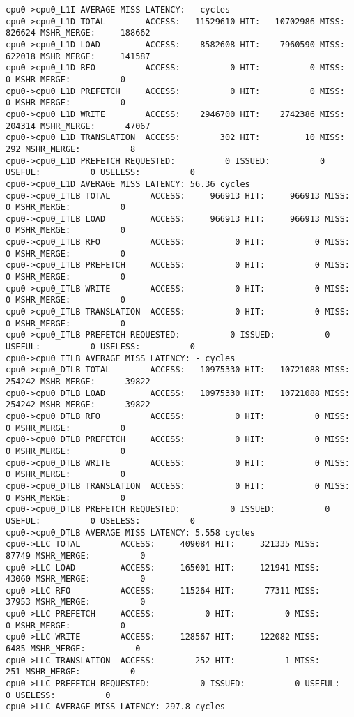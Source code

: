 \documentclass[17pt]{article}
\begin{document}
\begin{LTR}
\begin{lstlisting}[basicstyle=\tiny\ttfamily]
cpu0->cpu0_L1I AVERAGE MISS LATENCY: - cycles
cpu0->cpu0_L1D TOTAL        ACCESS:   11529610 HIT:   10702986 MISS:     826624 MSHR_MERGE:     188662
cpu0->cpu0_L1D LOAD         ACCESS:    8582608 HIT:    7960590 MISS:     622018 MSHR_MERGE:     141587
cpu0->cpu0_L1D RFO          ACCESS:          0 HIT:          0 MISS:          0 MSHR_MERGE:          0
cpu0->cpu0_L1D PREFETCH     ACCESS:          0 HIT:          0 MISS:          0 MSHR_MERGE:          0
cpu0->cpu0_L1D WRITE        ACCESS:    2946700 HIT:    2742386 MISS:     204314 MSHR_MERGE:      47067
cpu0->cpu0_L1D TRANSLATION  ACCESS:        302 HIT:         10 MISS:        292 MSHR_MERGE:          8
cpu0->cpu0_L1D PREFETCH REQUESTED:          0 ISSUED:          0 USEFUL:          0 USELESS:          0
cpu0->cpu0_L1D AVERAGE MISS LATENCY: 56.36 cycles
cpu0->cpu0_ITLB TOTAL        ACCESS:     966913 HIT:     966913 MISS:          0 MSHR_MERGE:          0
cpu0->cpu0_ITLB LOAD         ACCESS:     966913 HIT:     966913 MISS:          0 MSHR_MERGE:          0
cpu0->cpu0_ITLB RFO          ACCESS:          0 HIT:          0 MISS:          0 MSHR_MERGE:          0
cpu0->cpu0_ITLB PREFETCH     ACCESS:          0 HIT:          0 MISS:          0 MSHR_MERGE:          0
cpu0->cpu0_ITLB WRITE        ACCESS:          0 HIT:          0 MISS:          0 MSHR_MERGE:          0
cpu0->cpu0_ITLB TRANSLATION  ACCESS:          0 HIT:          0 MISS:          0 MSHR_MERGE:          0
cpu0->cpu0_ITLB PREFETCH REQUESTED:          0 ISSUED:          0 USEFUL:          0 USELESS:          0
cpu0->cpu0_ITLB AVERAGE MISS LATENCY: - cycles
cpu0->cpu0_DTLB TOTAL        ACCESS:   10975330 HIT:   10721088 MISS:     254242 MSHR_MERGE:      39822
cpu0->cpu0_DTLB LOAD         ACCESS:   10975330 HIT:   10721088 MISS:     254242 MSHR_MERGE:      39822
cpu0->cpu0_DTLB RFO          ACCESS:          0 HIT:          0 MISS:          0 MSHR_MERGE:          0
cpu0->cpu0_DTLB PREFETCH     ACCESS:          0 HIT:          0 MISS:          0 MSHR_MERGE:          0
cpu0->cpu0_DTLB WRITE        ACCESS:          0 HIT:          0 MISS:          0 MSHR_MERGE:          0
cpu0->cpu0_DTLB TRANSLATION  ACCESS:          0 HIT:          0 MISS:          0 MSHR_MERGE:          0
cpu0->cpu0_DTLB PREFETCH REQUESTED:          0 ISSUED:          0 USEFUL:          0 USELESS:          0
cpu0->cpu0_DTLB AVERAGE MISS LATENCY: 5.558 cycles
cpu0->LLC TOTAL        ACCESS:     409084 HIT:     321335 MISS:      87749 MSHR_MERGE:          0
cpu0->LLC LOAD         ACCESS:     165001 HIT:     121941 MISS:      43060 MSHR_MERGE:          0
cpu0->LLC RFO          ACCESS:     115264 HIT:      77311 MISS:      37953 MSHR_MERGE:          0
cpu0->LLC PREFETCH     ACCESS:          0 HIT:          0 MISS:          0 MSHR_MERGE:          0
cpu0->LLC WRITE        ACCESS:     128567 HIT:     122082 MISS:       6485 MSHR_MERGE:          0
cpu0->LLC TRANSLATION  ACCESS:        252 HIT:          1 MISS:        251 MSHR_MERGE:          0
cpu0->LLC PREFETCH REQUESTED:          0 ISSUED:          0 USEFUL:          0 USELESS:          0
cpu0->LLC AVERAGE MISS LATENCY: 297.8 cycles


\end{lstlisting}
\end{LTR}
\end{document}
